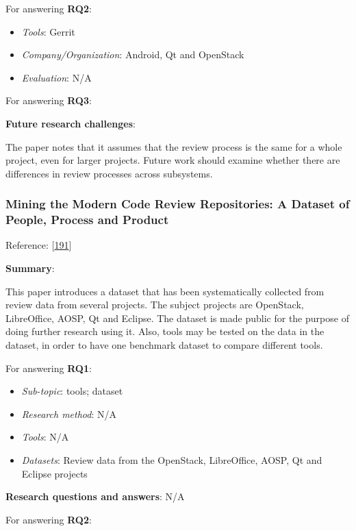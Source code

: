 \documentclass[]{book}
\providecommand{\tightlist}{%
  \setlength{\itemsep}{0pt}\setlength{\parskip}{0pt}}
\begin{document}
For answering \textbf{RQ2}:

\begin{itemize}
\tightlist
\item
  \emph{Tools}: Gerrit
\item
  \emph{Company/Organization}: Android, Qt and OpenStack
\item
  \emph{Evaluation}: N/A
\end{itemize}

For answering \textbf{RQ3}:

\textbf{Future research challenges}:

The paper notes that it assumes that the review process is the same for
a whole project, even for larger projects. Future work should examine
whether there are differences in review processes across subsystems.

\subsubsection{Mining the Modern Code Review Repositories: A Dataset of
People, Process and
Product}\label{mining-the-modern-code-review-repositories-a-dataset-of-people-process-and-product}

Reference: {[}\protect\hyperlink{ref-yang2016mining}{191}{]}

\textbf{Summary}:

This paper introduces a dataset that has been systematically collected
from review data from several projects. The subject projects are
OpenStack, LibreOffice, AOSP, Qt and Eclipse. The dataset is made public
for the purpose of doing further research using it. Also, tools may be
tested on the data in the dataset, in order to have one benchmark
dataset to compare different tools.

For answering \textbf{RQ1}:

\begin{itemize}
\tightlist
\item
  \emph{Sub-topic}: tools; dataset
\item
  \emph{Research method}: N/A
\item
  \emph{Tools}: N/A
\item
  \emph{Datasets}: Review data from the OpenStack, LibreOffice, AOSP, Qt
  and Eclipse projects
\end{itemize}

\textbf{Research questions and answers}: N/A

For answering \textbf{RQ2}:
\end{document}
